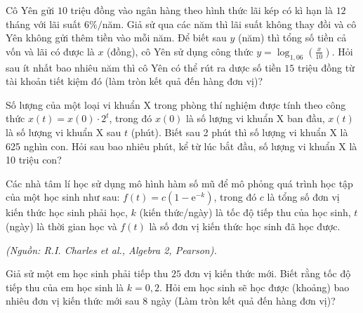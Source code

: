 \begin{ex}%
	Cô Yên gửi $10$ triệu đồng vào ngân hàng theo hình thức lãi kép có kì hạn là $12$ tháng với lãi suất $6 \% /$năm. Giả sử qua các năm thì lãi suất không thay đồi và cô Yên không gửi thêm tiền vào mỗi năm. Để biết sau $y$ (năm) thì tổng số tiền cả vốn và lãi có được là $x$ (đồng), cô Yên sử dụng công thức $y=\log _{1{,}06}\left(\frac{x}{10}\right)$. Hỏi sau ít nhất bao nhiêu năm thì cô Yên có thể rút ra dược số tiền $15$ triệu đồng từ tài khoản tiết kiệm đó (làm tròn kết quả đến hàng đơn vị)?\\
\end{ex}

\begin{ex}
	Số lượng của một loại vi khuẩn X trong phòng thí nghiệm được tính theo công thức $x(t)=x(0)\cdot 2^t$, trong đó $x(0)$ là số lượng vi khuẩn X ban đầu, $x(t)$ là số lượng vi khuẩn X sau $t$ (phút). Biết sau 2 phút thì số lượng vi khuẩn X là 625 nghìn con. Hỏi sau bao nhiêu phút, kể từ lúc bắt đầu, số lượng vi khuẩn X là 10 triệu con?\\
\end{ex}

\begin{ex}%
	Các nhà tâm lí học sử dụng mô hình hàm số mũ để mô phỏng quá trình học tập của một học sinh như sau: $f(t)=c\left(1-\mathrm{e}^{-k}\right)$, trong đó $c$ là tổng số đơn vị kiến thức học sinh phải học, $k$ (kiến thức/ngày) là tốc độ tiếp thu của học sinh, $t$ (ngày) là thời gian học và $f(t)$ là số đơn vị kiến thức học sinh đã học được.
	\begin{flushright}
		\textit{(Nguồn: R.I. Charles et al., Algebra 2, Pearson).}
	\end{flushright}
	Giả sử một em học sinh phải tiếp thu $25$ đơn vị kiến thức mới. Biết rằng tốc độ tiếp thu của em học sinh là $k=0{,}2$. Hỏi em học sinh sẽ học được (khoảng) bao nhiêu đơn vị kiến thức mới sau $8$ ngày (Làm tròn kết quả đến hàng đơn vị)?\\
\end{ex}

